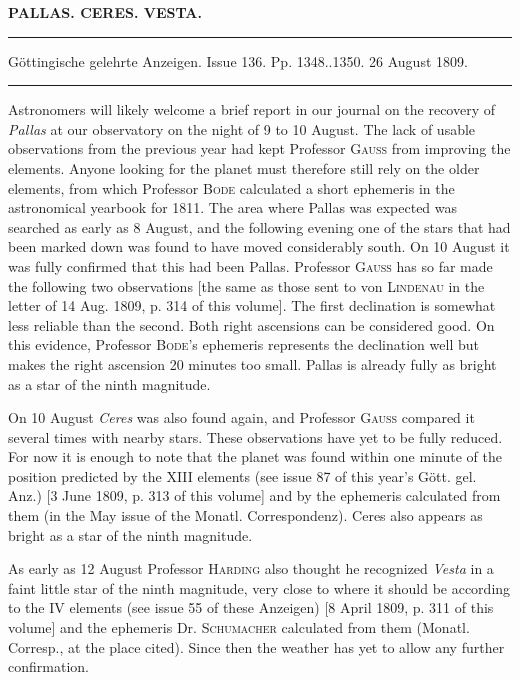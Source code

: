 \clearpage
{}
\begin{center}
\textbf{PALLAS. CERES. VESTA.}
\par\vspace{4pt}\hrule\vspace{4pt}
\fontsize{10}{12}\selectfont Göttingische gelehrte Anzeigen. Issue 136. Pp. 1348..1350. 26 August 1809.
\par\vspace{4pt}\hrule\vspace{4pt}
\end{center}

\par\indent Astronomers will likely welcome a brief report in our journal on the recovery of \emph{Pallas} at our observatory on the night of 9 to 10 August. The lack of usable observations from the previous year had kept Professor \textsc{Gauss} from improving the elements. Anyone looking for the planet must therefore still rely on the older elements, from which Professor \textsc{Bode} calculated a short ephemeris in the astronomical yearbook for 1811. The area where Pallas was expected was searched as early as 8 August, and the following evening one of the stars that had been marked down was found to have moved considerably south. On 10 August it was fully confirmed that this had been Pallas. Professor \textsc{Gauss} has so far made the following two observations [the same as those sent to von \textsc{Lindenau} in the letter of 14 Aug. 1809, p. 314 of this volume]. The first declination is somewhat less reliable than the second. Both right ascensions can be considered good. On this evidence, Professor \textsc{Bode}’s ephemeris represents the declination well but makes the right ascension 20 minutes too small. Pallas is already fully as bright as a star of the ninth magnitude.

\par\indent On 10 August \emph{Ceres} was also found again, and Professor \textsc{Gauss} compared it several times with nearby stars. These observations have yet to be fully reduced. For now it is enough to note that the planet was found within one minute of the position predicted by the XIII elements (see issue 87 of this year’s Gött. gel. Anz.) [3 June 1809, p. 313 of this volume] and by the ephemeris calculated from them (in the May issue of the Monatl. Correspondenz). Ceres also appears as bright as a star of the ninth magnitude.

\par\indent As early as 12 August Professor \textsc{Harding} also thought he recognized \emph{Vesta} in a faint little star of the ninth magnitude, very close to where it should be according to the IV elements (see issue 55 of these Anzeigen) [8 April 1809, p. 311 of this volume] and the ephemeris Dr. \textsc{Schumacher} calculated from them (Monatl. Corresp., at the place cited). Since then the weather has yet to allow any further confirmation.
